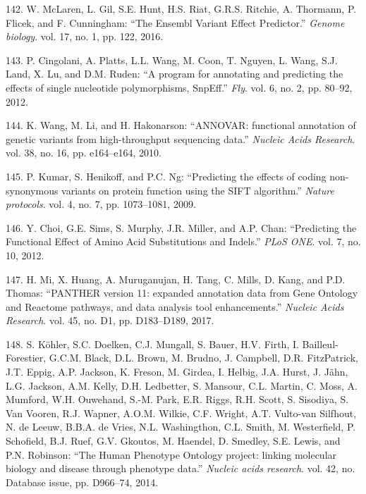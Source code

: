 \documentclass[12pt,twoside]{reedthesis}
\theoremstyle{definition}
\theoremstyle{definition}
\theoremstyle{remark}
\begin{document}
  \hypertarget{ref-McLaren2016}{}
  142. W. McLaren, L. Gil, S.E. Hunt, H.S. Riat, G.R.S. Ritchie, A.
  Thormann, P. Flicek, and F. Cunningham: ``The Ensembl Variant Effect
  Predictor.'' \emph{Genome biology}. vol. 17, no. 1, pp. 122, 2016.
  
  \hypertarget{ref-Cingolani2012}{}
  143. P. Cingolani, A. Platts, L.L. Wang, M. Coon, T. Nguyen, L. Wang,
  S.J. Land, X. Lu, and D.M. Ruden: ``A program for annotating and
  predicting the effects of single nucleotide polymorphisms, SnpEff.''
  \emph{Fly}. vol. 6, no. 2, pp. 80--92, 2012.
  
  \hypertarget{ref-Wang2010}{}
  144. K. Wang, M. Li, and H. Hakonarson: ``ANNOVAR: functional annotation
  of genetic variants from high-throughput sequencing data.''
  \emph{Nucleic Acids Research}. vol. 38, no. 16, pp. e164--e164, 2010.
  
  \hypertarget{ref-Kumar2009}{}
  145. P. Kumar, S. Henikoff, and P.C. Ng: ``Predicting the effects of
  coding non-synonymous variants on protein function using the SIFT
  algorithm.'' \emph{Nature protocols}. vol. 4, no. 7, pp. 1073--1081,
  2009.
  
  \hypertarget{ref-Choi2012}{}
  146. Y. Choi, G.E. Sims, S. Murphy, J.R. Miller, and A.P. Chan:
  ``Predicting the Functional Effect of Amino Acid Substitutions and
  Indels.'' \emph{PLoS ONE}. vol. 7, no. 10, 2012.
  
  \hypertarget{ref-Mi2017}{}
  147. H. Mi, X. Huang, A. Muruganujan, H. Tang, C. Mills, D. Kang, and
  P.D. Thomas: ``PANTHER version 11: expanded annotation data from Gene
  Ontology and Reactome pathways, and data analysis tool enhancements.''
  \emph{Nucleic Acids Research}. vol. 45, no. D1, pp. D183--D189, 2017.
  
  \hypertarget{ref-Kohler2014}{}
  148. S. Köhler, S.C. Doelken, C.J. Mungall, S. Bauer, H.V. Firth, I.
  Bailleul-Forestier, G.C.M. Black, D.L. Brown, M. Brudno, J. Campbell,
  D.R. FitzPatrick, J.T. Eppig, A.P. Jackson, K. Freson, M. Girdea, I.
  Helbig, J.A. Hurst, J. Jähn, L.G. Jackson, A.M. Kelly, D.H. Ledbetter,
  S. Mansour, C.L. Martin, C. Moss, A. Mumford, W.H. Ouwehand, S.-M. Park,
  E.R. Riggs, R.H. Scott, S. Sisodiya, S. Van Vooren, R.J. Wapner, A.O.M.
  Wilkie, C.F. Wright, A.T. Vulto-van Silfhout, N. de Leeuw, B.B.A. de
  Vries, N.L. Washingthon, C.L. Smith, M. Westerfield, P. Schofield, B.J.
  Ruef, G.V. Gkoutos, M. Haendel, D. Smedley, S.E. Lewis, and P.N.
  Robinson: ``The Human Phenotype Ontology project: linking molecular
  biology and disease through phenotype data.'' \emph{Nucleic acids
  research}. vol. 42, no. Database issue, pp. D966--74, 2014.
  
\end{document}
